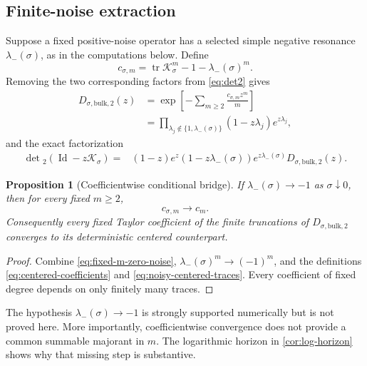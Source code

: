 \documentclass[11pt]{article}
\newtheorem{proposition}[theorem]{Proposition}
\theoremstyle{definition}
\theoremstyle{remark}
\newcommand{\cK}{\mathcal K}
\newcommand{\Id}{\operatorname{Id}}
\newcommand{\tr}{\operatorname{tr}}
\newcommand{\Det}{\operatorname{det}}
\begin{document}
\subsection{Finite-noise extraction}

Suppose a fixed positive-noise operator has a selected simple negative
resonance $\lambda_-(\sigma)$, as in the computations below.  Define
\begin{equation}\label{eq:noisy-centered-traces}
 c_{\sigma,m}
 =\tr\cK_\sigma^m-1-\lambda_-(\sigma)^m.
\end{equation}
Removing the two corresponding factors from \eqref{eq:det2} gives
\begin{align}
 D_{\sigma,\mathrm{bulk},2}(z)
 &=\exp\left[-\sum_{m\ge2}
 \frac{c_{\sigma,m}z^m}{m}\right]\label{eq:noisy-bulk-det-traces}\\
 &=\prod_{\lambda_j\notin\{1,\lambda_-(\sigma)\}}
 (1-z\lambda_j)e^{z\lambda_j},\label{eq:noisy-bulk-det-product}
\end{align}
and the exact factorization
\begin{align}
 \Det{}_2(\Id-z\cK_\sigma)
 ={}&(1-z)e^z
 (1-z\lambda_-(\sigma))e^{z\lambda_-(\sigma)}
 D_{\sigma,\mathrm{bulk},2}(z).
 \label{eq:noisy-factorization}
\end{align}

\begin{proposition}[Coefficientwise conditional bridge]
\label{prop:coefficientwise-bridge}
If $\lambda_-(\sigma)\to-1$ as $\sigma\downarrow0$, then for every fixed
$m\ge2$,
\begin{equation}\label{eq:coefficientwise-bridge}
 c_{\sigma,m}\longrightarrow c_m.
\end{equation}
Consequently every fixed Taylor coefficient of the finite truncations of
$D_{\sigma,\mathrm{bulk},2}$ converges to its deterministic centered
counterpart.
\end{proposition}

\begin{proof}
Combine \eqref{eq:fixed-m-zero-noise},
$\lambda_-(\sigma)^m\to(-1)^m$, and the definitions
\eqref{eq:centered-coefficients} and \eqref{eq:noisy-centered-traces}.
Every coefficient of fixed degree depends on only finitely many traces.
\end{proof}

The hypothesis $\lambda_-(\sigma)\to-1$ is strongly supported numerically but
is not proved here.  More importantly, coefficientwise convergence does not
provide a common summable majorant in $m$.  The logarithmic horizon in
\cref{cor:log-horizon} shows why that missing step is substantive.
\end{document}
